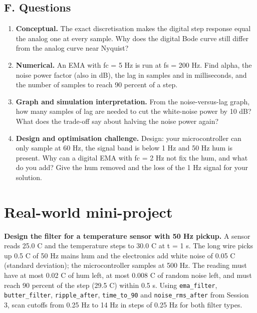 \documentclass[11pt,a4paper]{article}
\begin{document}
\subsection*{F. Questions}
\begin{enumerate}[nosep]
\item \textbf{Conceptual.} The exact discretisation makes the digital step response equal the analog one at every sample. Why does the digital Bode curve still differ from the analog curve near Nyquist?
\item \textbf{Numerical.} An EMA with fc = 5 Hz is run at fs = 200 Hz. Find alpha, the noise power factor (also in dB), the lag in samples and in milliseconds, and the number of samples to reach 90 percent of a step.
\item \textbf{Graph and simulation interpretation.} From the noise-versus-lag graph, how many samples of lag are needed to cut the white-noise power by 10 dB? What does the trade-off say about halving the noise power again?
\item \textbf{Design and optimisation challenge.} Design: your microcontroller can only sample at 60 Hz, the signal band is below 1 Hz and 50 Hz hum is present. Why can a digital EMA with fc = 2 Hz not fix the hum, and what do you add? Give the hum removed and the loss of the 1 Hz signal for your solution.
\end{enumerate}

\section{Real-world mini-project}
\textbf{Design the filter for a temperature sensor with 50 Hz pickup.} A sensor reads 25.0 C and the temperature steps to 30.0 C at t = 1 s. The long wire picks up 0.5 C of 50 Hz mains hum and the electronics add white noise of 0.05 C (standard deviation); the microcontroller samples at 500 Hz. The reading must have at most 0.02 C of hum left, at most 0.008 C of random noise left, and must reach 90 percent of the step (29.5 C) within 0.5 s. Using \texttt{ema\_filter}, \texttt{butter\_filter}, \texttt{ripple\_after}, \texttt{time\_to\_90} and \texttt{noise\_rms\_after} from Session 3, scan cutoffs from 0.25 Hz to 14 Hz in steps of 0.25 Hz for both filter types.
\end{document}
